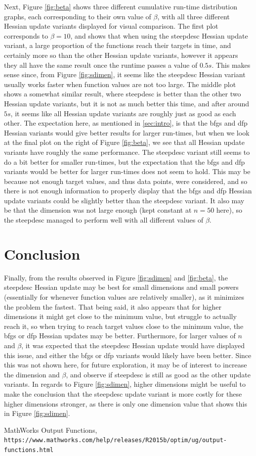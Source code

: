 \documentclass[sigconf, 7pt]{acmart}
\begin{document}
Next, Figure \ref{fig:beta} shows three different cumulative run-time distribution graphs, each corresponding to their own value of $\beta$, with all three different Hessian update variants displayed for visual comparison. The first plot corresponds to $\beta = 10$, and shows that when using the steepdesc Hessian update variant, a large proportion of the functions reach their targets in time, and certainly more so than the other Hessian update variants, however it appears they all have the same result once the runtime passes a value of $0.5s$. This makes sense since, from Figure \ref{fig:sdimen}, it seems like the steepdesc Hessian variant usually works faster when function values are not too large. The middle plot shows a somewhat similar result, where steepdesc is better than the other two Hessian update variants, but it is not as much better this time, and after around $5s$, it seems like all Hessian update variants are roughly just as good as each other. The expectation here, as mentioned in \ref{sec:intro}, is that the bfgs and dfp Hessian variants would give better results for larger run-times, but when we look at the final plot on the right of Figure \ref{fig:beta}, we see that all Hessian update variants have roughly the same performance. The steepdesc variant still seems to do a bit better for smaller run-times, but the expectation that the bfgs and dfp variants would be better for larger run-times does not seem to hold. This may be because not enough target values, and thus data points, were considered, and so there is not enough information to properly display that the bfgs and dfp Hessian update variants could be slightly better than the steepdesc variant. It also may be that the dimension was not large enough (kept constant at $n=50$ here), so the steepdesc managed to perform well with all different values of $\beta$.



\section{Conclusion}
\label{con}
Finally, from the results observed in Figure \ref{fig:sdimen} and \ref{fig:beta}, the steepdesc Hessian update may be best for small dimensions and small powers (essentially for whenever function values are relatively smaller), as it minimizes the problem the fastest. That being said, it also appears that for higher dimensions it might get close to the minimum value, but struggle to actually reach it, so when trying to reach target values close to the minimum value, the bfgs or dfp Hessian updates may be better. Furthermore, for  larger values of $n$ and $\beta$, it was expected that the steepdesc Hessian update would have displayed this issue, and either the bfgs or dfp variants would likely have been better. Since this was not shown here, for future exploration, it may be of interest to increase the dimension and $\beta$, and observe if steepdesc is still as good as the other update variants. In regards to Figure \ref{fig:sdimen}, higher dimensions might be useful to make the conclusion that the steepdesc update variant is more costly for these higher dimensions stronger, as there is only one dimension value that shows this in Figure \ref{fig:sdimen}. 

\begin{thebibliography}{9}
MathWorks Output Functions,
\\\texttt{https://www.mathworks.com/help/releases/R2015b/optim/ug/output-functions.html}
\end{thebibliography}
\end{document}
